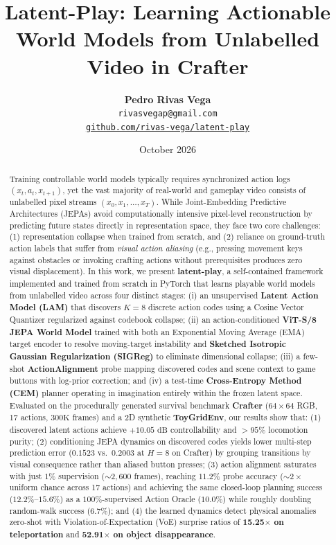 \documentclass[11pt,letterpaper]{article}
\title{\textbf{Latent-Play: Learning Actionable World Models from Unlabelled Video in Crafter}}
\author{
  \textbf{Pedro Rivas Vega} \\
  \texttt{rivasvegap@gmail.com} \\
  \href{https://github.com/rivas-vega/latent-play}{\texttt{github.com/rivas-vega/latent-play}}
}
\date{October 2026}
\begin{document}
\maketitle

\begin{abstract}
Training controllable world models typically requires synchronized action logs $(x_t, a_t, x_{t+1})$, yet the vast majority of real-world and gameplay video consists of unlabelled pixel streams $(x_0, x_1, \dots, x_T)$. While Joint-Embedding Predictive Architectures (JEPAs) avoid computationally intensive pixel-level reconstruction by predicting future states directly in representation space, they face two core challenges: (1) representation collapse when trained from scratch, and (2) reliance on ground-truth action labels that suffer from \emph{visual action aliasing} (e.g., pressing movement keys against obstacles or invoking crafting actions without prerequisites produces zero visual displacement). In this work, we present \textbf{latent-play}, a self-contained framework implemented and trained from scratch in PyTorch that learns playable world models from unlabelled video across four distinct stages: (i) an unsupervised \textbf{Latent Action Model (LAM)} that discovers $K=8$ discrete action codes using a Cosine Vector Quantizer regularized against codebook collapse; (ii) an action-conditioned \textbf{ViT-S/8 JEPA World Model} trained with both an Exponential Moving Average (EMA) target encoder to resolve moving-target instability and \textbf{Sketched Isotropic Gaussian Regularization (SIGReg)} to eliminate dimensional collapse; (iii) a few-shot \textbf{ActionAlignment} probe mapping discovered codes and scene context to game buttons with log-prior correction; and (iv) a test-time \textbf{Cross-Entropy Method (CEM)} planner operating in imagination entirely within the frozen latent space. Evaluated on the procedurally generated survival benchmark \textbf{Crafter} ($64\times 64$ RGB, 17 actions, $300\text{K}$ frames) and a 2D synthetic \textbf{ToyGridEnv}, our results show that: (1) discovered latent actions achieve $+10.05\text{ dB}$ controllability and $>95\%$ locomotion purity; (2) conditioning JEPA dynamics on discovered codes yields lower multi-step prediction error ($0.1523$ vs.\ $0.2003$ at $H=8$ on Crafter) by grouping transitions by visual consequence rather than aliased button presses; (3) action alignment saturates with just $1\%$ supervision ($\sim 2{,}600$ frames), reaching $11.2\%$ probe accuracy ($\sim 2\times$ uniform chance across 17 actions) and achieving the same closed-loop planning success ($12.2\%\text{--}15.6\%$) as a $100\%$-supervised Action Oracle ($10.0\%$) while roughly doubling random-walk success ($6.7\%$); and (4) the learned dynamics detect physical anomalies zero-shot with Violation-of-Expectation (VoE) surprise ratios of \textbf{15.25$\times$ on teleportation} and \textbf{52.91$\times$ on object disappearance}.
\end{abstract}
\end{document}
